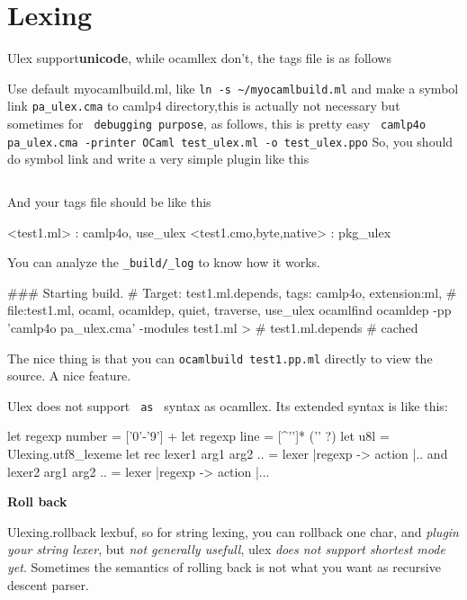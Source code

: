 \section{Lexing}
Ulex support\textbf{unicode}, while ocamllex don't, the tags file is
as follows


Use default myocamlbuild.ml, like \verb|ln -s ~/myocamlbuild.ml| and
make a symbol link \verb|pa_ulex.cma| to camlp4 directory,this is
actually not necessary but sometimes for \verb| debugging purpose|,
as follows, this is pretty easy 
\verb| camlp4o pa_ulex.cma -printer OCaml test_ulex.ml -o test_ulex.ppo|
So, you should do symbol link and write a very simple plugin like this

\inputminted[fontsize=\scriptsize,firstline=117,lastline=125]{ocaml}{lexing/code/ulex/myocamlbuild.ml}
And your tags file should be like this 
\begin{bluetext}
<test1.ml> : camlp4o, use_ulex
<test1.{cmo,byte,native}> : pkg_ulex
\end{bluetext}
You can analyze the \verb|_build/_log| to know how it works.
\begin{bluetext}
### Starting build.
# Target: test1.ml.depends, tags: { camlp4o, extension:ml,
# file:test1.ml, ocaml, ocamldep, quiet, traverse, use_ulex }
ocamlfind ocamldep -pp 'camlp4o pa_ulex.cma' -modules test1.ml >
# test1.ml.depends # cached
\end{bluetext}

The nice thing is that you can \verb|ocamlbuild test1.pp.ml| directly
to view the source. A nice feature.


Ulex does not support \verb| as | syntax as ocamllex.  Its extended
syntax is like this:
\begin{ocamlcode} 
let regexp number = ['0'-'9'] + 
let regexp line = [^'\n']* ('\n' ?)  
let u8l = Ulexing.utf8_lexeme 
let rec lexer1 arg1 arg2 .. = lexer 
   |regexp -> action |..  
and lexer2 arg1 arg2 .. = lexer
   |regexp -> action |...
\end{ocamlcode}

\textbf{Roll back} 

Ulexing.rollback lexbuf, so for string lexing, you
can rollback one char, and \textit{plugin your string lexer}, but
\textit{not generally usefull}, ulex \textit{does not support shortest
mode yet}. Sometimes the semantics of rolling back is not what you
want as recursive descent parser.

